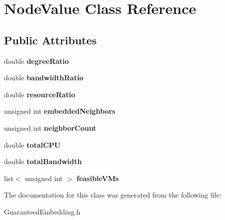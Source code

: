 \hypertarget{classNodeValue}{\section{\-Node\-Value \-Class \-Reference}
\label{classNodeValue}
}
\subsection*{\-Public \-Attributes}
\begin{DoxyCompactItemize}
\item 
\hypertarget{classNodeValue_ac89df0b88e3e6bc18dd18c01f92306f9}{double {\bfseries degree\-Ratio}}\label{classNodeValue_ac89df0b88e3e6bc18dd18c01f92306f9}

\item 
\hypertarget{classNodeValue_a930f3d694ba48819a10120215a2fe2c4}{double {\bfseries bandwidth\-Ratio}}\label{classNodeValue_a930f3d694ba48819a10120215a2fe2c4}

\item 
\hypertarget{classNodeValue_ae4f6550328d6ce3ae7bad2583dcb503e}{double {\bfseries resource\-Ratio}}\label{classNodeValue_ae4f6550328d6ce3ae7bad2583dcb503e}

\item 
\hypertarget{classNodeValue_af8c1cf5eff435a2704a61df93681aeee}{unsigned int {\bfseries embedded\-Neighbors}}\label{classNodeValue_af8c1cf5eff435a2704a61df93681aeee}

\item 
\hypertarget{classNodeValue_ad30281ec968462be9c55286fea4fd9cb}{unsigned int {\bfseries neighbor\-Count}}\label{classNodeValue_ad30281ec968462be9c55286fea4fd9cb}

\item 
\hypertarget{classNodeValue_a0d532a55ada186a3a2ddefc9f6fa10ff}{double {\bfseries total\-C\-P\-U}}\label{classNodeValue_a0d532a55ada186a3a2ddefc9f6fa10ff}

\item 
\hypertarget{classNodeValue_aefad32c8cf42d56c3ecb2e2a29328d83}{double {\bfseries total\-Bandwidth}}\label{classNodeValue_aefad32c8cf42d56c3ecb2e2a29328d83}

\item 
\hypertarget{classNodeValue_aea11a843bf2c4fb5bd71fc560868a614}{list$<$ unsigned int $>$ {\bfseries feasible\-V\-Ms}}\label{classNodeValue_aea11a843bf2c4fb5bd71fc560868a614}

\end{DoxyCompactItemize}


\-The documentation for this class was generated from the following file\-:\begin{DoxyCompactItemize}
\item 
\-Guaranteed\-Embedding.\-h\end{DoxyCompactItemize}
